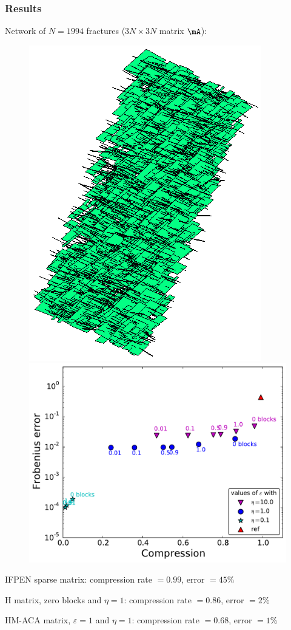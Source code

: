\begin{frame}
\frametitle{Results}

\small

Network of $N=1994$ fractures ($3N\times 3N$ matrix $\mA$):
\vspace{-5pt}
\begin{figure}
\centering
\includegraphics[width=.3\textwidth]{../images/visu_maillage1994Fracs.png}
\includegraphics[width=.6\textwidth]{../images/graphe_compasparse_output_compression_18_08_2016matrice1994Fracs.pdf}
\end{figure}

\vspace{-5pt}
{\footnotesize
IFPEN sparse matrix: compression rate $=0.99$, error $=45\%$

H matrix, zero blocks and $\eta=1$: compression rate $=0.86$, error $=2\%$

HM-ACA matrix, $\varepsilon=1$ and $\eta=1$: compression rate $=0.68$, error $=1\%$}

\end{frame}












